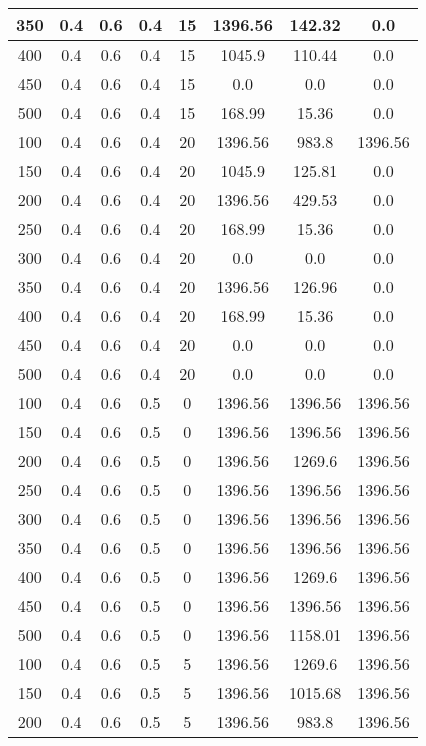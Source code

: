 \documentclass[a4paper, 12pt]{extreport}
\begin{document}
\begin{itemize}
\begin{longtable}{|c|c|c|c|c|c|c|c|}
			350 & 0.4 & 0.6 & 0.4 & 15 & 1396.56 & 142.32 & 0.0 \\\hline
			400 & 0.4 & 0.6 & 0.4 & 15 & 1045.9 & 110.44 & 0.0 \\\hline
			450 & 0.4 & 0.6 & 0.4 & 15 & 0.0 & 0.0 & 0.0 \\\hline
			500 & 0.4 & 0.6 & 0.4 & 15 & 168.99 & 15.36 & 0.0 \\\hline
			100 & 0.4 & 0.6 & 0.4 & 20 & 1396.56 & 983.8 & 1396.56 \\\hline
			150 & 0.4 & 0.6 & 0.4 & 20 & 1045.9 & 125.81 & 0.0 \\\hline
			200 & 0.4 & 0.6 & 0.4 & 20 & 1396.56 & 429.53 & 0.0 \\\hline
			250 & 0.4 & 0.6 & 0.4 & 20 & 168.99 & 15.36 & 0.0 \\\hline
			300 & 0.4 & 0.6 & 0.4 & 20 & 0.0 & 0.0 & 0.0 \\\hline
			350 & 0.4 & 0.6 & 0.4 & 20 & 1396.56 & 126.96 & 0.0 \\\hline
			400 & 0.4 & 0.6 & 0.4 & 20 & 168.99 & 15.36 & 0.0 \\\hline
			450 & 0.4 & 0.6 & 0.4 & 20 & 0.0 & 0.0 & 0.0 \\\hline
			500 & 0.4 & 0.6 & 0.4 & 20 & 0.0 & 0.0 & 0.0 \\\hline
			100 & 0.4 & 0.6 & 0.5 & 0 & 1396.56 & 1396.56 & 1396.56 \\\hline
			150 & 0.4 & 0.6 & 0.5 & 0 & 1396.56 & 1396.56 & 1396.56 \\\hline
			200 & 0.4 & 0.6 & 0.5 & 0 & 1396.56 & 1269.6 & 1396.56 \\\hline
			250 & 0.4 & 0.6 & 0.5 & 0 & 1396.56 & 1396.56 & 1396.56 \\\hline
			300 & 0.4 & 0.6 & 0.5 & 0 & 1396.56 & 1396.56 & 1396.56 \\\hline
			350 & 0.4 & 0.6 & 0.5 & 0 & 1396.56 & 1396.56 & 1396.56 \\\hline
			400 & 0.4 & 0.6 & 0.5 & 0 & 1396.56 & 1269.6 & 1396.56 \\\hline
			450 & 0.4 & 0.6 & 0.5 & 0 & 1396.56 & 1396.56 & 1396.56 \\\hline
			500 & 0.4 & 0.6 & 0.5 & 0 & 1396.56 & 1158.01 & 1396.56 \\\hline
			100 & 0.4 & 0.6 & 0.5 & 5 & 1396.56 & 1269.6 & 1396.56 \\\hline
			150 & 0.4 & 0.6 & 0.5 & 5 & 1396.56 & 1015.68 & 1396.56 \\\hline
			200 & 0.4 & 0.6 & 0.5 & 5 & 1396.56 & 983.8 & 1396.56 \\\hline

\end{longtable}
\end{itemize}
\end{document}
